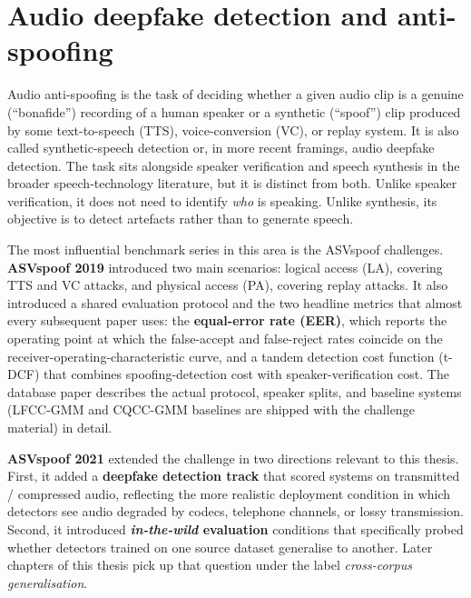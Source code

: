 \section{Audio deepfake detection and anti-spoofing}
\label{sec:background-anti-spoofing}

Audio anti-spoofing is the task of deciding whether a given audio
clip is a genuine (``bonafide'') recording of a human speaker or a
synthetic (``spoof'') clip produced by some text-to-speech (TTS),
voice-conversion (VC), or replay system. It is also called
synthetic-speech detection or, in more recent framings, audio
deepfake detection. The task sits alongside speaker verification
and speech synthesis in the broader speech-technology literature,
but it is distinct from both. Unlike speaker verification, it does
not need to identify \emph{who} is speaking. Unlike synthesis, its
objective is to detect artefacts rather than to generate speech.

The most influential benchmark series in this area is the ASVspoof
challenges. \textbf{ASVspoof 2019} \cite{Todisco2019_ASVspoof}
introduced two main scenarios: logical access (LA), covering TTS
and VC attacks, and physical access (PA), covering replay attacks.
It also introduced a shared evaluation protocol and the two
headline metrics that almost every subsequent paper uses: the
\textbf{equal-error rate (EER)}, which reports the operating point
at which the false-accept and false-reject rates coincide on the
receiver-operating-characteristic curve, and a tandem detection
cost function (t-DCF) that combines spoofing-detection cost with
speaker-verification cost. The database paper
\cite{ASVspoof2019_Database} describes the actual protocol, speaker
splits, and baseline systems (LFCC-GMM and CQCC-GMM baselines are
shipped with the challenge material) in detail.

\textbf{ASVspoof 2021} \cite{Yamagishi2021_ASVspoof2021} extended
the challenge in two directions relevant to this thesis. First, it
added a \textbf{deepfake detection track} that scored systems on
transmitted / compressed audio, reflecting the more realistic
deployment condition in which detectors see audio degraded by
codecs, telephone channels, or lossy transmission. Second, it
introduced \textbf{\emph{in-the-wild} evaluation} conditions
\cite{Liu2022_ASVspoofInTheWild} that specifically probed whether
detectors trained on one source dataset generalise to another.
Later chapters of this thesis pick up that question under the
label \emph{cross-corpus generalisation}.

